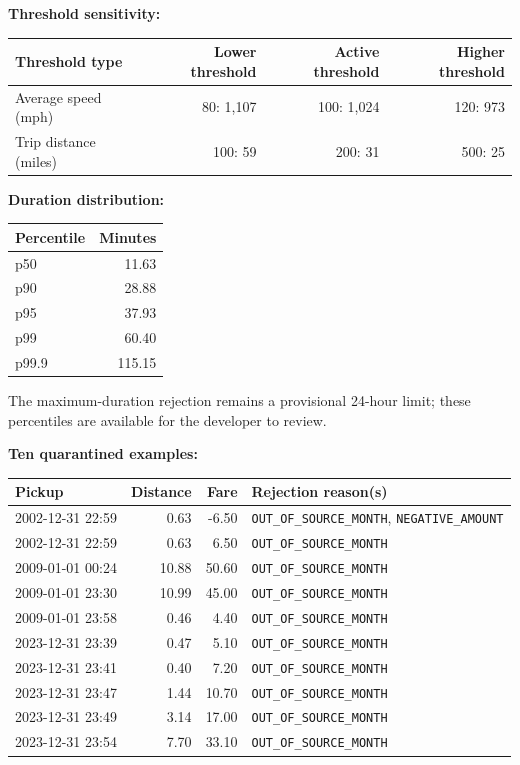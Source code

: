 \documentclass[11pt,a4paper]{article}
\begin{document}
\textbf{Threshold sensitivity:}
\begin{center}
\begin{tabular}{lrrr}
\hline
Threshold type & Lower threshold & Active threshold & Higher threshold \\
\hline
Average speed (mph) & 80: 1,107 & 100: 1,024 & 120: 973 \\
Trip distance (miles) & 100: 59 & 200: 31 & 500: 25 \\
\hline
\end{tabular}
\end{center}

\textbf{Duration distribution:}
\begin{center}
\begin{tabular}{lr}
\hline
Percentile & Minutes \\
\hline
p50 & 11.63 \\
p90 & 28.88 \\
p95 & 37.93 \\
p99 & 60.40 \\
p99.9 & 115.15 \\
\hline
\end{tabular}
\end{center}
The maximum-duration rejection remains a provisional 24-hour limit; these
percentiles are available for the developer to review.

\textbf{Ten quarantined examples:}
\begingroup
\small
\begin{longtable}{p{3.0cm}rrp{6.5cm}}
\hline
Pickup & Distance & Fare & Rejection reason(s) \\
\hline
2002-12-31 22:59 & 0.63 & -6.50 & \texttt{OUT\_OF\_SOURCE\_MONTH}, \texttt{NEGATIVE\_AMOUNT} \\
2002-12-31 22:59 & 0.63 & 6.50 & \texttt{OUT\_OF\_SOURCE\_MONTH} \\
2009-01-01 00:24 & 10.88 & 50.60 & \texttt{OUT\_OF\_SOURCE\_MONTH} \\
2009-01-01 23:30 & 10.99 & 45.00 & \texttt{OUT\_OF\_SOURCE\_MONTH} \\
2009-01-01 23:58 & 0.46 & 4.40 & \texttt{OUT\_OF\_SOURCE\_MONTH} \\
2023-12-31 23:39 & 0.47 & 5.10 & \texttt{OUT\_OF\_SOURCE\_MONTH} \\
2023-12-31 23:41 & 0.40 & 7.20 & \texttt{OUT\_OF\_SOURCE\_MONTH} \\
2023-12-31 23:47 & 1.44 & 10.70 & \texttt{OUT\_OF\_SOURCE\_MONTH} \\
2023-12-31 23:49 & 3.14 & 17.00 & \texttt{OUT\_OF\_SOURCE\_MONTH} \\
2023-12-31 23:54 & 7.70 & 33.10 & \texttt{OUT\_OF\_SOURCE\_MONTH} \\
\hline
\end{longtable}
\endgroup
\end{document}
